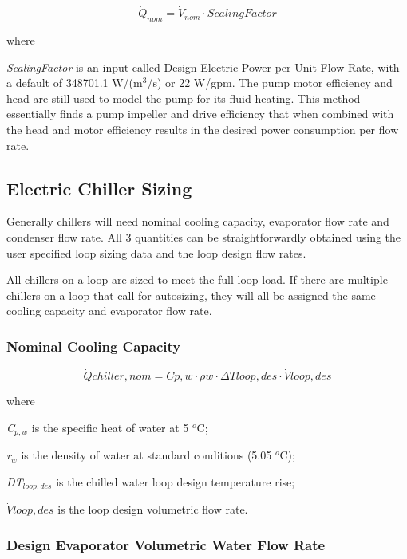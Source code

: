 \begin{equation}
\dot Q_{nom} = \dot V_{nom} \cdot ScalingFactor
\end{equation}

where

\emph{ScalingFactor} is an input called Design Electric Power per Unit Flow Rate, with a default of 348701.1 W/(m\(^{3}\)/s) or 22 W/gpm. The pump motor efficiency and head are still used to model the pump for its fluid heating. This method essentially finds a pump impeller and drive efficiency that when combined with the head and motor efficiency results in the desired power consumption per flow rate.

\subsection{Electric Chiller Sizing}\label{electric-chiller-sizing}

Generally chillers will need nominal cooling capacity, evaporator flow rate and condenser flow rate. All 3 quantities can be straightforwardly obtained using the user specified loop sizing data and the loop design flow rates.

All chillers on a loop are sized to meet the full loop load. If there are multiple chillers on a loop that call for autosizing, they will all be assigned the same cooling capacity and evaporator flow rate.

\subsubsection{Nominal Cooling Capacity}\label{nominal-cooling-capacity}

\begin{equation}
\dot Qchiller,nom = Cp,w\cdot \rho w\cdot \Delta Tloop,des\cdot \dot Vloop,des
\end{equation}

where

\emph{C\(_{p,w}\)} is the specific heat of water at 5 \(^{o}\)C;

\emph{r\(_{w}\)} is the density of water at standard conditions (5.05 \(^{o}\)C);

\emph{DT\(_{loop,des}\)} is the chilled water loop design temperature rise;

\(\dot Vloop,des\) is the loop design volumetric flow rate.

\subsubsection{Design Evaporator Volumetric Water Flow Rate}\label{design-evaporator-volumetric-water-flow-rate}


